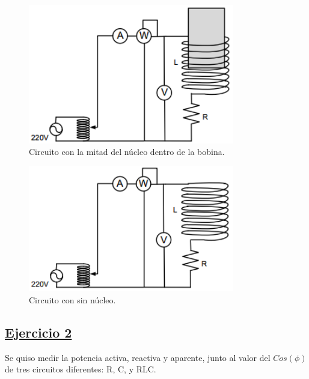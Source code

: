 \documentclass[a4paper]{article}
\begin{document}
\begin{figure}[H]
	\centering
	\includegraphics[width=0.8\textwidth]{Circuito-ejercicio-1B}
	\caption{Circuito con la mitad del núcleo dentro de la bobina.}
	\label{fig:1b}
\end{figure}

\begin{figure}[H]
	\centering
	\includegraphics[width=0.8\textwidth]{Circuito-ejercicio-1C}
	\caption{Circuito con sin núcleo.}
	\label{fig:1c}
\end{figure}

\newpage

\subsection*{\underline{Ejercicio 2}}

Se quiso medir la potencia activa, reactiva y aparente, junto al valor del $Cos(\phi)$ de tres circuitos diferentes: R, C, y RLC.
\end{document}
